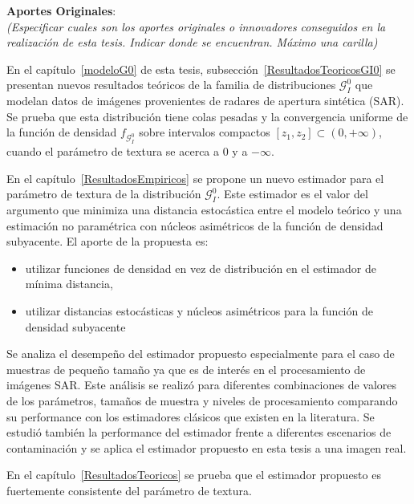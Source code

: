 \textbf{Aportes Originales}:\\
\emph{(Especificar cuales son los aportes originales o innovadores conseguidos en la realización de esta tesis. Indicar donde se encuentran. Máximo una carilla)}

\vspace{0.5cm}
En el capítulo~\ref{modeloG0} de esta tesis, subsección~\ref{ResultadosTeoricosGI0} se presentan nuevos resultados teóricos de la familia de distribuciones $\mathcal{G}_I^0$ que modelan datos de imágenes provenientes de radares de apertura sintética (SAR). Se prueba que esta distribución tiene colas pesadas y la convergencia uniforme de la función de densidad $f_{\mathcal{G}_I^0}$ sobre intervalos compactos $[z_1,z_2]\subset(0,+\infty)$, cuando el parámetro de textura se acerca a $0$ y a $-\infty$.

En el capítulo~\ref{ResultadosEmpiricos} se propone un nuevo estimador para el parámetro de textura de la distribución $\mathcal{G}_I^0$. Este estimador es el valor del argumento que minimiza una distancia estocástica entre el modelo teórico y una estimación no paramétrica con núcleos asimétricos de la función de densidad subyacente. 
El aporte de la propuesta es:
\begin{itemize}
	\item utilizar funciones de densidad en vez de distribución en el estimador de mínima distancia,
	\item utilizar distancias estocásticas y núcleos asimétricos para la función de densidad subyacente
\end{itemize} 

 Se analiza el desempeño del estimador propuesto especialmente para el caso de muestras de pequeño tamaño ya que es de interés en el procesamiento de imágenes SAR. Este análisis se realizó para diferentes combinaciones de valores de los parámetros, tamaños de muestra y niveles de procesamiento comparando su performance con los estimadores clásicos que existen en la literatura. Se estudió también la performance del estimador frente a diferentes escenarios de contaminación y se aplica el estimador propuesto en esta tesis a una imagen real.

En el capítulo~\ref{ResultadosTeoricos} se prueba que el estimador propuesto es fuertemente consistente del parámetro de textura.
%
%	